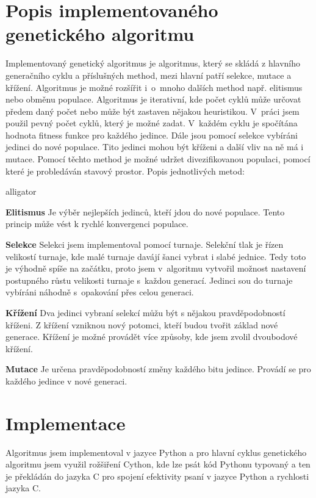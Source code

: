 \documentclass[11pt]{article}
\begin{document}
\section{Popis implementovaného genetického algoritmu}\label{kap:popisALG}
Implementovaný genetický algoritmus je algoritmus, který se skládá z hlavního generačního cyklu a příslušných method, mezi hlavní patří selekce, mutace a křížení. Algoritmus je možné rozšířit i~o~mnoho dalších method např. elitismus nebo obměnu populace. Algoritmus je iterativní, kde počet cyklů může určovat předem daný počet nebo může být zastaven nějakou heuristikou. V~práci jsem použil pevný počet cyklů, který je možné zadat. V~každém cyklu je spočítána hodnota fitness funkce pro každého jedince. Dále jsou pomocí selekce vybíráni jedinci do nové populace. Tito jedinci mohou být kříženi a další vliv na ně má i mutace. Pomocí těchto method je možné udržet divezifikovanou populaci, pomocí které je probledáván stavový prostor. Popis jednotlivých metod:
\begin{labeling}{alligator}
\item[\textbf{Elitismus}] Je výběr nejlepších jedinců, kteří jdou do nové populace. Tento princip může vést k rychlé konvergenci populace.
\item[\textbf{Selekce}] Selekci jsem implementoval pomocí turnaje. Selekční tlak je řízen velikostí turnaje, kde malé turnaje davájí šanci vybrat i slabé jednice. Tedy toto je výhodně spíše na začátku, proto jsem v~algoritmu vytvořil možnost nastavení postupného růstu velikosti turnaje s~každou generací. Jedinci sou do turnaje vybíráni náhodně s~opakování přes celou generaci. 
\item[\textbf{Křížení}] Dva jedinci vybraní selekcí můžu být s nějakou pravděpodobností kříženi. Z křížení vzniknou nový potomci, kteří budou tvořit základ nové generace. Křížení je možné provádět více způsoby, kde jsem zvolil dvoubodové křížení.
\item[\textbf{Mutace}] Je určena pravděpodobností změny každého bitu jedince. Provádí se pro každého jedince v nové generaci.

\end{labeling}
\section{Implementace}\label{kap:implementace}
Algoritmus jsem implementoval v jazyce Python a pro hlavní cyklus genetického algoritmu jsem využil rožšiření Cython, kde lze psát kód Pythonu typovaný a ten je překládán do jazyka C pro spojení efektivity psaní v jazyce Python a rychlosti jazyka C. 
\end{document}

